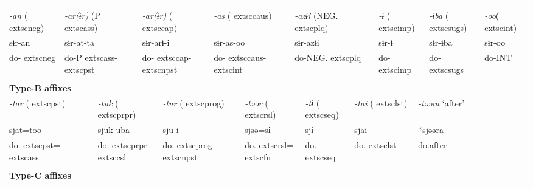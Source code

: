 \tabletail{}
\tablelasttail{}
\begin{tabularx}{\textwidth}{XXXXXXXXXXXXXXXXXXXXX}
\lsptoprule
\multicolumn{21}{X}{{\bfseries Type-A affixes}}\\
{ \textit{{}-an} (	extsc{neg})} & \multicolumn{4}{X}{{ \textit{{}-ar(ɨr)} (P	extsc{ass})}} & \multicolumn{5}{X}{{ \textit{{}-ar(ɨr)} (	extsc{cap})}} & \multicolumn{4}{X}{{ \textit{{}-as} (	extsc{caus})}} & \multicolumn{3}{X}{{ \textit{{}-azɨi} (NEG.	extsc{plq})}} & \multicolumn{2}{X}{{ \textit{{}-ɨ} (	extsc{imp})}} & { \textit{{}-ɨba} (	extsc{sugs})} & { \textit{{}-oo}(	extsc{int})}\\
{ sɨr-an} & \multicolumn{4}{X}{{ sɨr-at-ta}} & \multicolumn{5}{X}{{ sɨr-arɨ-i}} & \multicolumn{4}{X}{{ sɨr-as-oo}} & \multicolumn{3}{X}{{ sɨr-azɨi}} & \multicolumn{2}{X}{{ sɨr-ɨ}} & { sɨr-ɨba} & { sɨr-oo}\\
do-	extsc{neg} & \multicolumn{4}{X}{do-P	extsc{ass}-	extsc{pst}} & \multicolumn{5}{X}{do-	extsc{cap}-	extsc{npst}} & \multicolumn{4}{X}{do-	extsc{caus}-	extsc{int}} & \multicolumn{3}{X}{do-NEG.	extsc{plq}} & \multicolumn{2}{X}{do-	extsc{imp}} & do-	extsc{sugs} & do-INT\\
\multicolumn{21}{X}{}\\
\multicolumn{21}{X}{{\bfseries Type-B affixes}}\\
\multicolumn{3}{X}{{ \textit{{}-tar} (	extsc{pst})}} & \multicolumn{4}{X}{{ \textit{{}-tuk} (	extsc{prpr})}} & \multicolumn{4}{X}{{ \textit{{}-tur} (	extsc{prog})}} & \multicolumn{4}{X}{{ \textit{{}-təər} (	extsc{rsl})}} & { \textit{{}-tɨ} (	extsc{seq})} & \multicolumn{2}{X}{{ \textit{{}-tai} (	extsc{lst})}} & \multicolumn{3}{X}{{ \textit{{}-təəra} ‘after’}}\\
\multicolumn{3}{X}{{ sjat=too}} & \multicolumn{4}{X}{{ sjuk-uba}} & \multicolumn{4}{X}{{ sju-i}} & \multicolumn{4}{X}{{ sjəə=sɨ}} & { sjɨ} & \multicolumn{2}{X}{{ sjai}} & \multicolumn{3}{X}{{ *sjəəra}}\\
\multicolumn{3}{X}{do.	extsc{pst}=	extsc{ass}} & \multicolumn{4}{X}{do.	extsc{prpr}-	extsc{csl}} & \multicolumn{4}{X}{do.	extsc{prog}-	extsc{npst}} & \multicolumn{4}{X}{do.	extsc{rsl}=	extsc{fn}} & do.	extsc{seq} & \multicolumn{2}{X}{do.	extsc{lst}} & \multicolumn{3}{X}{{ do.after}}\\
\multicolumn{3}{X}{} & \multicolumn{4}{X}{} & \multicolumn{4}{X}{} & \multicolumn{4}{X}{} &  & \multicolumn{2}{X}{} & \multicolumn{3}{X}{}\\
\multicolumn{21}{X}{{\bfseries Type-C affixes}}\\

\end{tabularx}
